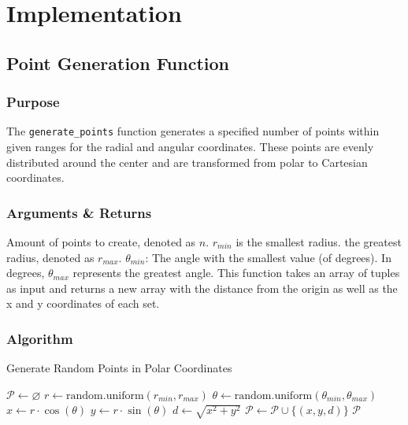 \documentclass[12pt,a4paper]{report}
\begin{document}
\section{Implementation}

\subsection{Point Generation Function}

\subsubsection{Purpose}
The \texttt{generate\_points} function generates a specified number of points within given ranges for the radial and angular coordinates. These points are evenly distributed around the center and are transformed from polar to Cartesian coordinates.

\subsubsection{Arguments \& Returns}
Amount of points to create, denoted as $n$. $r_{min}$ is the smallest radius. the greatest radius, denoted as $r_{max}$. $\theta_{min}$: The angle with the smallest value (of degrees). In degrees, $\theta_{max}$ represents the greatest angle. This function takes an array of tuples as input and returns a new array with the distance from the origin as well as the x and y coordinates of each set.


\vspace*{\fill} \newpage

\subsubsection{Algorithm}

\begin{algorithm}
\caption{Generate Random Points in Polar Coordinates}
\begin{algorithmic}[1]
    \State $\mathcal{P} \gets \varnothing$
        \State $r \gets \text{random.uniform}(r_{min}, r_{max})$
        \State $\theta \gets \text{random.uniform}(\theta_{min}, \theta_{max})$
        \State $x \gets r \cdot \cos(\theta)$
        \State $y \gets r \cdot \sin(\theta)$
        \State $d \gets \sqrt{x^2 + y^2}$
        \State $\mathcal{P} \gets \mathcal{P} \cup \{(x, y, d)\}$
    \EndFor
    \State \Return $\mathcal{P}$
\EndFunction
\end{algorithmic}
\end{algorithm}
\end{document}
